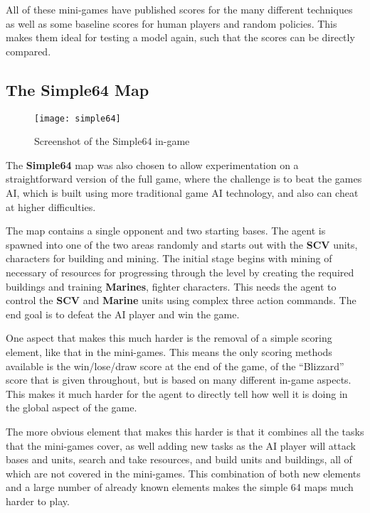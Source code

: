 All of these mini-games have published scores for the many different
techniques as well as some baseline scores for human players and random
policies. This makes them ideal for testing a model again, such that the scores can
be directly compared.

\subsection{The \textbf{Simple64} Map}

\begin{figure}[h!]
    \centering
    \texttt{[image: simple64]}
    \caption{Screenshot of the Simple64 in-game}
    \label{fig:simple64}
\end{figure}

The \textbf{Simple64} map was also chosen to allow experimentation on a
straightforward version of the full game, where the challenge is to beat the
games AI, which is built using more traditional game AI technology, and also can
cheat at higher difficulties.

The map contains a single opponent and two starting bases. The agent is spawned
into one of the two areas randomly and starts out with the \textbf{SCV} units,
characters for building and mining. The initial stage begins with mining of
necessary of resources for progressing through the level by creating the
required buildings and training \textbf{Marines}, fighter characters. This needs
the agent to control the \textbf{SCV} and \textbf{Marine} units using complex
three action commands. The end goal is to defeat the AI player and win the game.

One aspect that makes this much harder is the removal of a simple scoring
element, like that in the mini-games. This means the only scoring methods
available is the win/lose/draw score at the end of the game, of the ``Blizzard''
score that is given throughout, but is based on many different in-game aspects.
This makes it much harder for the agent to directly tell how well it is doing in
the global aspect of the game.

The more obvious element that makes this harder is that it combines all the
tasks that the mini-games cover, as well adding new tasks as the AI player will
attack bases and units, search and take resources, and build units and
buildings, all of which are not covered in the mini-games. This combination of
both new elements and a large number of already known elements makes the simple
64 maps much harder to play.

